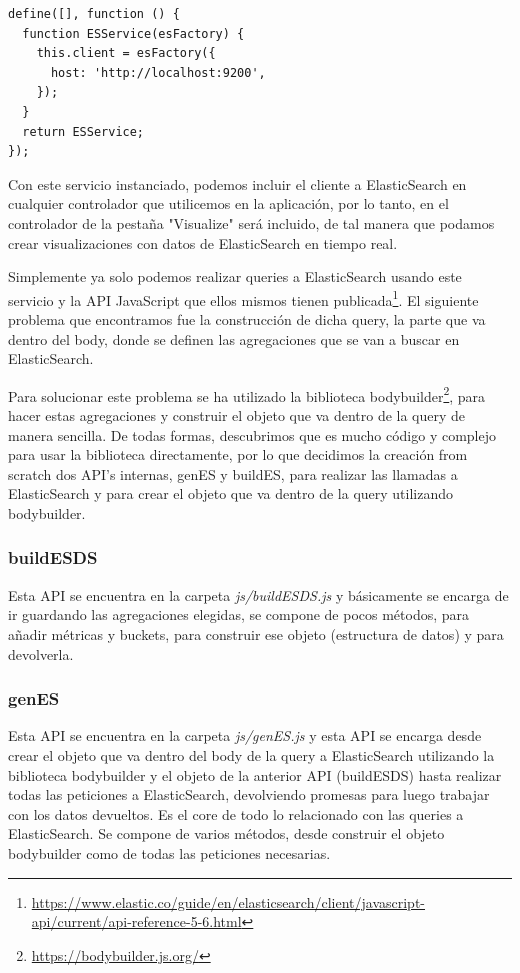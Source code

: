 \documentclass[a4paper, 12pt]{book}
\begin{document}
\begin{lstlisting}[frame=single]
define([], function () {
  function ESService(esFactory) {
    this.client = esFactory({
      host: 'http://localhost:9200',
    });
  }
  return ESService;
});
\end{lstlisting}

Con este servicio instanciado, podemos incluir el cliente a ElasticSearch en cualquier controlador que utilicemos en la aplicación, por lo tanto, en el controlador de la pestaña "Visualize" será incluido, de tal manera que podamos crear visualizaciones con datos de ElasticSearch en tiempo real.

Simplemente ya solo podemos realizar queries a ElasticSearch usando este servicio y la API JavaScript que ellos mismos tienen publicada\footnote{\url{https://www.elastic.co/guide/en/elasticsearch/client/javascript-api/current/api-reference-5-6.html}}. El siguiente problema que encontramos fue la construcción de dicha query, la parte que va dentro del body, donde se definen las agregaciones que se van a buscar en ElasticSearch.

Para solucionar este problema se ha utilizado la biblioteca bodybuilder\footnote{\url{https://bodybuilder.js.org/}}, para hacer estas agregaciones y construir el objeto que va dentro de la query de manera sencilla. De todas formas, descubrimos que es mucho código y complejo para usar la biblioteca directamente, por lo que decidimos la creación from scratch dos API's internas, genES y buildES, para realizar las llamadas a ElasticSearch y para crear el objeto que va dentro de la query utilizando bodybuilder.

\subsubsection{buildESDS}
Esta API se encuentra en la carpeta \textit{js/buildESDS.js} y básicamente se encarga de ir guardando las agregaciones elegidas, se compone de pocos métodos, para añadir métricas y buckets, para construir ese objeto (estructura de datos) y para devolverla.

\subsubsection{genES}
Esta API se encuentra en la carpeta \textit{js/genES.js} y esta API se encarga desde crear el objeto que va dentro del body de la query a ElasticSearch utilizando la biblioteca bodybuilder y el objeto de la anterior API (buildESDS) hasta realizar todas las peticiones a ElasticSearch, devolviendo promesas para luego trabajar con los datos devueltos. Es el core de todo lo relacionado con las queries a ElasticSearch. Se compone de varios métodos, desde construir el objeto bodybuilder como de todas las peticiones necesarias.
\end{document}
